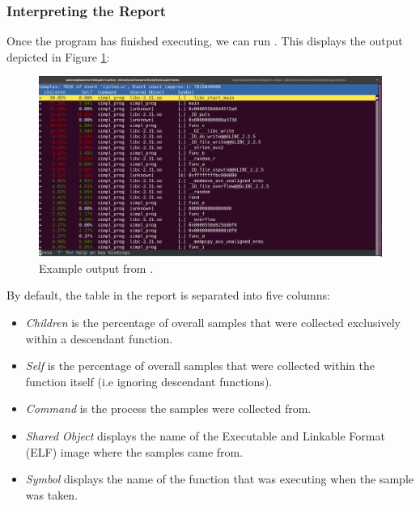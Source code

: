 \subsubsection{Interpreting the Report}

Once the program has finished executing, we can run . This displays the output depicted in Figure \ref{fig:perf_report_output}:

\begin{figure}[!h]
    \includegraphics[width=\linewidth]{thesis-a_perf_report}
    \caption{Example output from .}
    \label{fig:perf_report_output}
\end{figure}

By default, the table in the report is separated into five columns:

\ssp
\begin{itemize}
    \item \textit{Children} is the percentage of overall samples that were collected exclusively within a descendant function.
    \item \textit{Self} is the percentage of overall samples that were collected within the function itself (i.e ignoring descendant functions).
    \item \textit{Command} is the process the samples were collected from.
    \item \textit{Shared Object} displays the name of the Executable and Linkable Format (ELF) image where the samples came from.
    \item \textit{Symbol} displays the name of the function that was executing when the sample was taken.
\end{itemize}
\dsp

